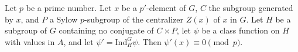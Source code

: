 Let $p$ be a prime number. Let $x$ be a $p'$-element of $G$, $C$ the subgroup generated by $x$, and $P$ a Sylow $p$-subgroup of the centralizer $Z(x)$ of $x$ in $G$. Let $H$ be a subgroup of $G$ containing no conjugate of $C \times P$, let $\psi$ be a class function on $H$ with values in $A$, and let $\psi' = \text{Ind}_H^G \psi$. Then $\psi'(x) \equiv 0 \pmod{p}$.
